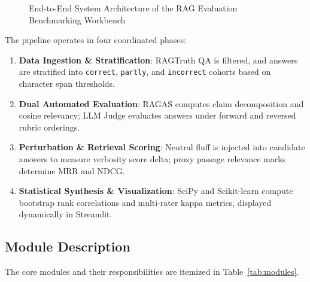 \documentclass[11pt,a4paper]{article}
\begin{document}
\begin{figure}[htbp]
\caption{End-to-End System Architecture of the RAG Evaluation Benchmarking Workbench}
\label{fig:architecture}
\end{figure}

The pipeline operates in four coordinated phases:
\begin{enumerate}[leftmargin=*]
    \item \textbf{Data Ingestion \& Stratification}: RAGTruth QA is filtered, and answers are stratified into \texttt{correct}, \texttt{partly}, and \texttt{incorrect} cohorts based on character span thresholds.
    \item \textbf{Dual Automated Evaluation}: RAGAS computes claim decomposition and cosine relevancy; LLM Judge evaluates answers under forward and reversed rubric orderings.
    \item \textbf{Perturbation \& Retrieval Scoring}: Neutral fluff is injected into candidate answers to measure verbosity score delta; proxy passage relevance marks determine MRR and NDCG.
    \item \textbf{Statistical Synthesis \& Visualization}: SciPy and Scikit-learn compute bootstrap rank correlations and multi-rater kappa metrics, displayed dynamically in Streamlit.
\end{enumerate}

\subsection{Module Description}
The core modules and their responsibilities are itemized in Table~\ref{tab:modules}.
\end{document}
